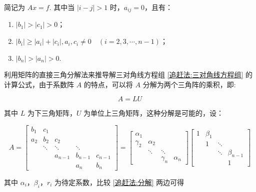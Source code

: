 简记为 \textbf{$Ax=f$}. 其中当 $\left|i-j\right| > 1$ 时，$a_{ij} = 0$，且有：

\begin{enumerate}
    \item $\left|b_1\right| > \left|c_1\right| > 0$；
    \item $\left|b_i\right| \geq \left|a_i\right| + \left|c_i\right|, a_i, c_i \neq 0\quad(i=2,3,\cdots,n-1)$；
    \item $\left|b_n\right| > \left|a_n\right| > 0$.
\end{enumerate}

利用矩阵的直接三角分解法来推导解三对角线方程组 \eqref{追赶法:三对角线方程组} 的计算公式，由于系数阵 $A$ 的特点，可以将 $A$ 分解为两个三角阵的乘积，即:

\[A=LU\]

其中 $L$ 为下三角矩阵，$U$ 为单位上三角矩阵，这种分解是可能的，设：

\begin{equation}
    A =
    \begin{bmatrix}
        b_1 & c_1                                  \\
        a_2 & b_2    & c_2                         \\
            & \ddots & \ddots  & \ddots            \\
            &        & a_{n-1} & b_{n-1} & c_{n-1} \\
            &        &         & a_n     & b_n
    \end{bmatrix}
    =
    \begin{bmatrix}
        \alpha_1                                  \\
        \gamma_2 & \alpha_2                       \\
                 & \ddots   & \ddots              \\
                 &          & \gamma_n & \alpha_n
    \end{bmatrix}
    \begin{bmatrix}
        1 & \beta_1                        \\
          & 1       & \ddots               \\
          &         & \ddots & \beta_{n-1} \\
          &         &        & 1
    \end{bmatrix}
    \label{追赶法:分解}
\end{equation}

其中 $\alpha_i$，$\beta_i$，$r_i$ 为待定系数，比较 \eqref{追赶法:分解} 两边可得

